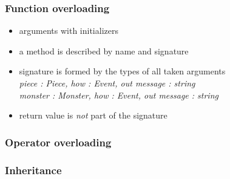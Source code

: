 \documentclass{slides}
\begin{document}
\begin{frame}
  \frametitle{Function overloading}
  
  \begin{center}
  \end{center}

  \begin{itemize}
  \item arguments with initializers
  \item a method is described by name and \alert{signature}
  \item signature is formed by the types of all taken arguments\\
    \emph{piece : Piece, how : Event, out message : string}\\
    \emph{monster : Monster, how : Event, out message : string}
  \item return value is \emph{not} part of the signature
  \end{itemize}

\end{frame}

\begin{frame}
  \frametitle{Operator overloading}
  
\end{frame}

\begin{frame}
  \frametitle{Inheritance}

  \begin{center}
  \end{center}
  
\end{frame}
\end{document}
